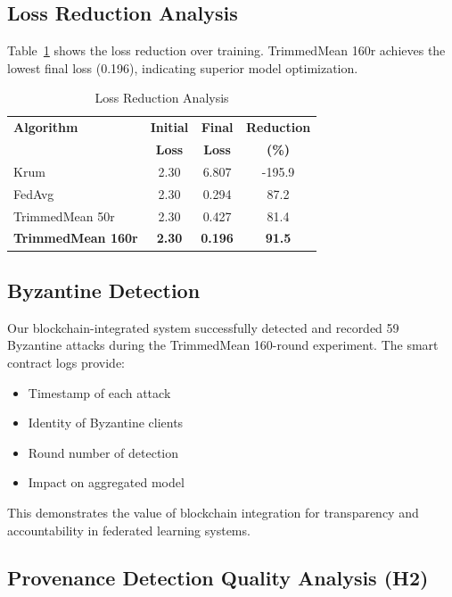 \documentclass{ieeeaccess}
\begin{document}
\subsection{Loss Reduction Analysis}

Table~\ref{tab:loss_analysis} shows the loss reduction over training. TrimmedMean 160r achieves the lowest final loss (0.196), indicating superior model optimization.

\begin{table}[t]
\caption{Loss Reduction Analysis}
\label{tab:loss_analysis}
\centering
\begin{tabular}{lccc}
\toprule
\textbf{Algorithm} & \textbf{Initial} & \textbf{Final} & \textbf{Reduction} \\
& \textbf{Loss} & \textbf{Loss} & \textbf{(\%)} \\
\midrule
Krum & 2.30 & 6.807 & -195.9 \\
FedAvg & 2.30 & 0.294 & 87.2 \\
TrimmedMean 50r & 2.30 & 0.427 & 81.4 \\
\textbf{TrimmedMean 160r} & \textbf{2.30} & \textbf{0.196} & \textbf{91.5} \\
\bottomrule
\end{tabular}
\end{table}

\subsection{Byzantine Detection}

Our blockchain-integrated system successfully detected and recorded 59 Byzantine attacks during the TrimmedMean 160-round experiment. The smart contract logs provide:

\begin{itemize}
    \item Timestamp of each attack
    \item Identity of Byzantine clients
    \item Round number of detection
    \item Impact on aggregated model
\end{itemize}

This demonstrates the value of blockchain integration for transparency and accountability in federated learning systems.

\subsection{Provenance Detection Quality Analysis (H2)}
\end{document}
